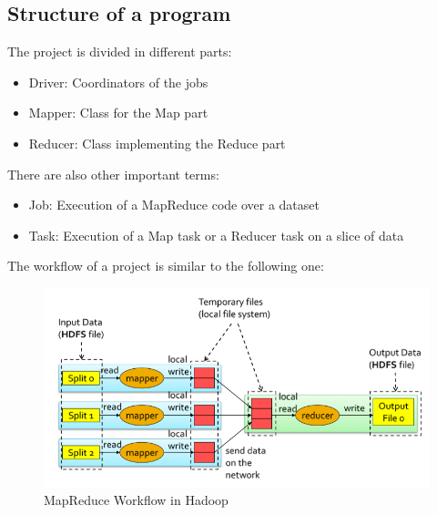 \documentclass[12pt]{article}
\begin{document}
\subsection{Structure of a program}
The project is divided in different parts:
\begin{itemize}
  \item Driver: Coordinators of the jobs
  \item Mapper: Class for the Map part
  \item Reducer: Class implementing the Reduce part
\end{itemize}
There are also other important terms:
\begin{itemize}
  \item Job: Execution of a MapReduce code over a dataset
  \item Task: Execution of a Map task or a Reducer task on a slice of data
\end{itemize}
The workflow of a project is similar to the following one:
\begin{figure}[H]
  \includegraphics[width=\linewidth]{images/wf.png}
  \caption{MapReduce Workflow in Hadoop}
  \label{fig:wf}
\end{figure}
\end{document}
